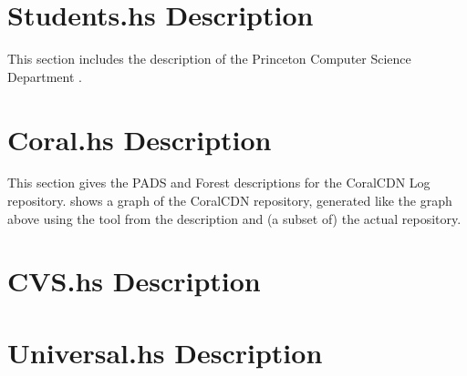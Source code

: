 \documentclass[nocopyrightspace,natbib,onecolumn,9pt]{sigplanconf}
\begin{document}
\section{Students.hs Description}
This section includes the \forest{} description of the Princeton
Computer Science Department \filestore{}.


\section{Coral.hs Description}

This section gives the PADS and Forest descriptions for the CoralCDN
Log repository.  shows a graph of the CoralCDN
repository, generated like the graph above using the 
tool from the description and (a subset of) the actual repository.



\newpage

\section{CVS.hs Description}


\section{Universal.hs Description}

\end{document}
